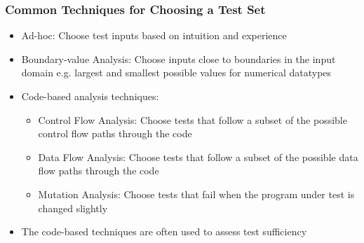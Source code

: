 \documentclass{beamer}
\begin{document}
\begin{frame}
\frametitle{Common Techniques for Choosing a Test Set}
\begin{itemize}
	\item Ad-hoc: Choose test inputs based on intuition and experience
	\item Boundary-value Analysis: Choose inputs close to boundaries in the input domain e.g. largest and smallest possible values for numerical datatypes
	\item Code-based analysis techniques:
	\begin{itemize}
		\item Control Flow Analysis: Choose tests that follow a subset of the possible control flow paths through the code
		\item Data Flow Analysis: Choose tests that follow a subset of the possible data flow paths through the code
		\item Mutation Analysis: Choose tests that fail when the program under test is changed slightly
	\end{itemize}
	\item The code-based techniques are often used to assess test sufficiency
\end{itemize}
\end{frame}

\end{document}
